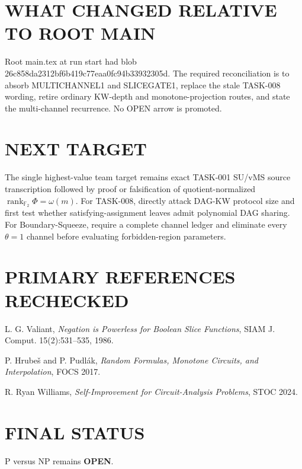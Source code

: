 \documentclass[11pt]{article}
\begin{document}
\section*{WHAT CHANGED RELATIVE TO ROOT MAIN}
Root main.tex at run start had blob 26c858da2312bf6b419c77eaa0fc94b33932305d. The required reconciliation is to absorb MULTICHANNEL1 and SLICEGATE1, replace the stale TASK-008 wording, retire ordinary KW-depth and monotone-projection routes, and state the multi-channel recurrence. No OPEN arrow is promoted.

\section*{NEXT TARGET}
The single highest-value team target remains exact TASK-001 SU/vMS source transcription followed by proof or falsification of quotient-normalized $\operatorname{rank}_{\mathbb F_2}\Phi=\omega(m)$. For TASK-008, directly attack DAG-KW protocol size and first test whether satisfying-assignment leaves admit polynomial DAG sharing. For Boundary-Squeeze, require a complete channel ledger and eliminate every $\theta=1$ channel before evaluating forbidden-region parameters.

\section*{PRIMARY REFERENCES RECHECKED}
L. G. Valiant, \emph{Negation is Powerless for Boolean Slice Functions}, SIAM J. Comput. 15(2):531--535, 1986.

P. Hrube\v{s} and P. Pudl\'ak, \emph{Random Formulas, Monotone Circuits, and Interpolation}, FOCS 2017.

R. Ryan Williams, \emph{Self-Improvement for Circuit-Analysis Problems}, STOC 2024.

\section*{FINAL STATUS}
P versus NP remains \textbf{OPEN}.
\end{document}
